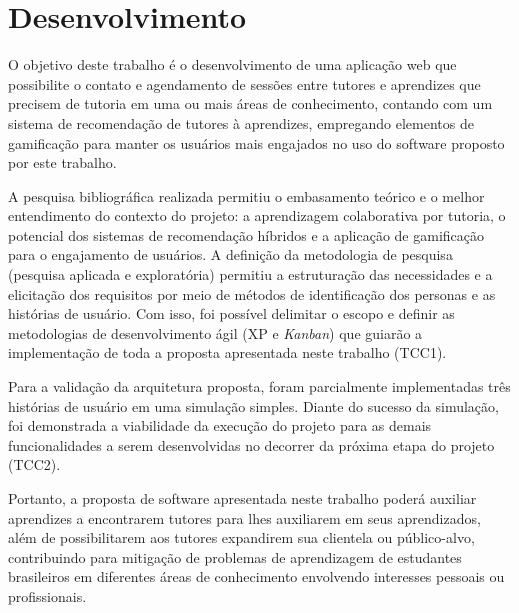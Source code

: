 \chapter[Desenvolvimento]{Desenvolvimento}
\label{cap:desenvolvimento}

O objetivo deste trabalho é o desenvolvimento de uma aplicação web que possibilite o contato e agendamento de sessões entre tutores e aprendizes que precisem de tutoria em uma ou mais áreas de conhecimento, contando com um sistema de recomendação de tutores à aprendizes, empregando elementos de gamificação para manter os usuários mais engajados no uso do software proposto por este trabalho.

A pesquisa bibliográfica realizada permitiu o embasamento teórico e o melhor
entendimento do contexto do projeto: a aprendizagem colaborativa por tutoria, o potencial dos sistemas de recomendação híbridos e a aplicação de gamificação para o engajamento de usuários. A definição da metodologia de pesquisa (pesquisa aplicada e exploratória) permitiu a estruturação das necessidades e a elicitação dos requisitos por meio de métodos de identificação dos personas e as histórias de usuário. Com isso, foi possível delimitar o escopo e definir as metodologias de desenvolvimento ágil (XP e \textit{Kanban}) que guiarão a implementação de toda a proposta apresentada neste trabalho (TCC1).

Para a validação da arquitetura proposta, foram parcialmente implementadas três histórias de usuário em uma simulação simples. Diante do sucesso da simulação, foi demonstrada a viabilidade da execução do projeto para as demais funcionalidades a serem desenvolvidas no decorrer da próxima etapa do projeto (TCC2).

Portanto, a proposta de software apresentada neste trabalho poderá auxiliar aprendizes a encontrarem tutores para lhes auxiliarem em seus aprendizados, além de possibilitarem aos tutores expandirem sua clientela ou público-alvo, contribuindo para mitigação de problemas de aprendizagem de estudantes brasileiros em diferentes áreas de conhecimento envolvendo interesses pessoais ou profissionais.
